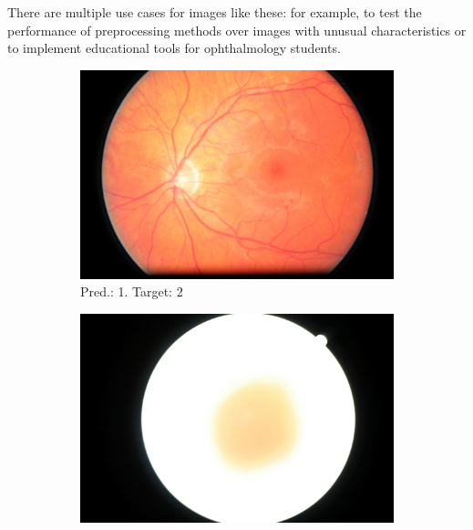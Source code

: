 There are multiple use cases for images like these: for example, to test the performance of preprocessing methods over images with unusual characteristics or to implement educational tools for ophthalmology students. 

\begin{figure}[tb]
     \centering
     \begin{subfigure}[b]{0.32\textwidth}
         \centering
         \includegraphics[height=\textwidth,width=\textwidth]{figures/chapter5/unconfident/10345_right.jpeg}
         \caption{Pred.: 1. Target: 2}
         \label{fig:unconfident0}
     \end{subfigure}
     \hfill
     \begin{subfigure}[b]{0.32\textwidth}
         \centering
         \includegraphics[height=\textwidth,width=\textwidth]{figures/chapter5/unconfident/3042_left.jpeg}

\end{subfigure}
\end{figure}
